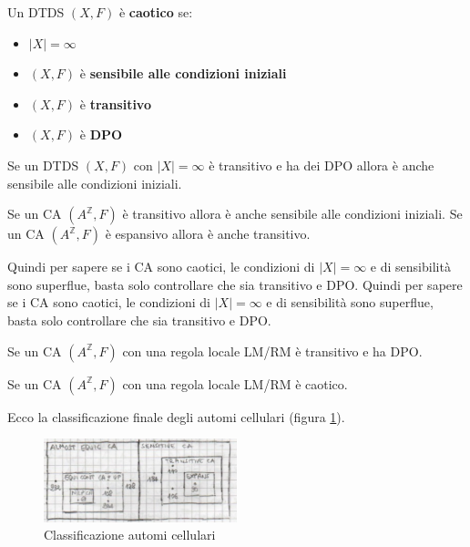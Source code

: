 \begin{definizione} 
    Un DTDS $(X,F)$ è \textbf{caotico} se:
    \begin{itemize}
        \item $|X|=\infty$
        \item $(X,F)$ è \textbf{sensibile alle condizioni iniziali}
        \item $(X,F)$ è \textbf{transitivo}
        \item $(X,F)$ è \textbf{DPO}
    \end{itemize}
\end{definizione}

\begin{teorema}
    Se un DTDS $(X,F)$ con $|X|=\infty$ è transitivo e ha dei DPO allora è anche
    sensibile alle condizioni iniziali.
\end{teorema}

\begin{teorema} 
    Se un CA $(A^\mathbb{Z},F)$ è transitivo allora è anche sensibile alle condizioni iniziali.
    Se un CA $(A^\mathbb{Z},F)$ è espansivo allora è anche transitivo.
\end{teorema}

Quindi per sapere se i CA sono caotici, le condizioni di $|X|=\infty$ e di sensibilità sono superflue,
basta solo controllare che sia transitivo e DPO.
Quindi per sapere se i CA sono caotici, le condizioni di $|X|=\infty$ e di sensibilità sono superflue,
basta solo controllare che sia transitivo e DPO.

\begin{teorema}
    Se un CA $(A^\mathbb{Z},F)$ con una regola locale LM/RM è transitivo e ha DPO.
\end{teorema}
\begin{teorema}
    Se un CA $(A^\mathbb{Z},F)$ con una regola locale LM/RM è caotico.
\end{teorema}

Ecco la classificazione finale degli automi cellulari (figura \ref{fig:classificazione_ca}).

\begin{figure}[!hb]
    \centering
    \includegraphics[width=0.5\textwidth]{img/sistemi_complessi/classificazione_ca.png}
    \caption{Classificazione automi cellulari}
    \label{fig:classificazione_ca}
\end{figure}

